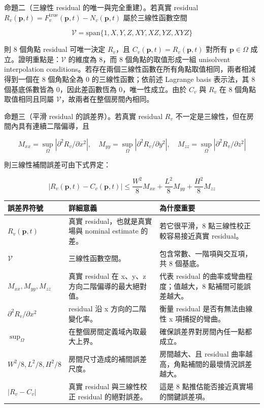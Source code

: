 \documentclass[12pt,a4paper]{article}
\begin{document}
命題二（三線性 residual 的唯一與完全重建）。若真實 residual $R_v(\mathbf{p},t)=F_v^{\text{true}}(\mathbf{p},t)-N_v(\mathbf{p},t)$ 屬於三線性函數空間


\[
\mathcal{V}=\mathrm{span}\{1,X,Y,Z,XY,XZ,YZ,XYZ\}
\]

則 8 個角點 residual 可唯一決定 $R_v$，且 $C_v(\mathbf{p},t)=R_v(\mathbf{p},t)$ 對所有 $\mathbf{p}\in\Omega$ 成立。證明重點是：$\mathcal{V}$ 的維度為 8，而 8 個角點的取值形成一組 unisolvent interpolation conditions。若存在兩個三線性函數在所有角點取值相同，兩者相減得到一個在 8 個角點全為 0 的三線性函數；依前述 Lagrange basis 表示法，其 8 個基底係數皆為 0，因此差函數恆為 0，唯一性成立。由於 $C_v$ 與 $R_v$ 在 8 個角點取值相同且同屬 $\mathcal{V}$，故兩者在整個房間內相同。


命題三（平滑 residual 的誤差界）。若真實 residual $R_v$ 不一定是三線性，但在房間內具有連續二階偏導，且


\[
M_{xx}=\sup_{\Omega}|\partial^2 R_v/\partial x^2|,\quad M_{yy}=\sup_{\Omega}|\partial^2 R_v/\partial y^2|,\quad M_{zz}=\sup_{\Omega}|\partial^2 R_v/\partial z^2|
\]

則三線性補間誤差可由下式界定：


\[
|R_v(\mathbf{p},t)-C_v(\mathbf{p},t)|\le \frac{W^2}{8}M_{xx}+\frac{L^2}{8}M_{yy}+\frac{H^2}{8}M_{zz}
\]

\begin{table}[htbp]
\centering
\footnotesize
\renewcommand{\arraystretch}{1.25}
\begin{tabular}{|>{\raggedright\arraybackslash}p{}|>{\raggedright\arraybackslash}p{}|>{\raggedright\arraybackslash}p{}|}
\hline
\textbf{誤差界符號} & \textbf{詳細意義} & \textbf{為什麼重要} \\
\hline
$R_v(\mathbf{p},t)$ & 真實 residual，也就是真實場與 nominal estimate 的差。 & 若它很平滑，8 點三線性校正較容易接近真實 residual。 \\
\hline
$\mathcal{V}$ & 三線性函數空間。 & 包含常數、一階項與交互項，共 8 個基底。 \\
\hline
$M_{xx},M_{yy},M_{zz}$ & 真實 residual 在 x、y、z 方向二階偏導的最大絕對值。 & 代表 residual 的曲率或彎曲程度；值越大，8 點補間可能誤差越大。 \\
\hline
$\partial^2R_v/\partial x^2$ & residual 沿 x 方向的二階變化率。 & 衡量 residual 是否有無法由線性 x 項捕捉的彎曲。 \\
\hline
$\sup_{\Omega}$ & 在整個房間定義域內取最大上界。 & 確保誤差界對房間內任一點都成立。 \\
\hline
$W^2/8,L^2/8,H^2/8$ & 房間尺寸造成的補間誤差尺度。 & 房間越大、且 residual 曲率越高，角點補間的最壞情況誤差越大。 \\
\hline
$|R_v-C_v|$ & 真實 residual 與三線性校正 residual 的絕對誤差。 & 這是 8 點推估能否接近真實場的關鍵誤差項。 \\
\hline
\end{tabular}
\end{table}
\end{document}
